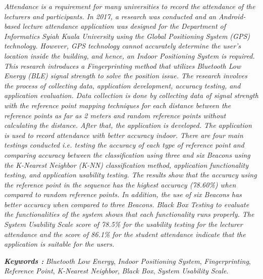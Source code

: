 \begin{abstracteng}
\textit{Attendance is a requirement for many universities to record the attendance of the lecturers and participants. In 2017, a research was conducted and an Android-based lecture attendance application was designed for the Department of Informatics Syiah Kuala University using the Global Positioning System (GPS) technology. However, GPS technology cannot accurately determine the user’s location inside the building, and hence, an Indoor Positioning System is required. This research introduces a Fingerprinting method that utilizes Bluetooth Low Energy (BLE) signal strength to solve the position issue. The research involves the process of collecting data, application development, accuracy testing, and application evaluation. Data collection is done by collecting data of signal strength with the reference point mapping techniques for each distance between the reference points as far as 2 meters and random reference points without calculating the distance. After that, the application is developed. The application is used to record attendance with better accuracy indoor. There are four main testings conducted i.e. testing the accuracy of each type of reference point and comparing accuracy between the classification using three and six Beacons using the K-Nearest Neighbor (K-NN) classification method, application functionality testing, and application usability testing. The results show that the accuracy using the reference point in the sequence has the highest accuracy (78.60\%) when compared to random reference points. In addition, the use of six Beacons has better accuracy when compared to three Beacons. Black Box Testing to evaluate the functionalities of the system shows that each functionality runs properly. The System Usability Scale score of 78.5\% for the usability testing for the lecturer attendance and the score of 86.1\% for the student attendance indicate that the application is suitable for the users.}

\bigskip
\noindent
\textbf{\emph{Keywords :}} \textit{Bluetooth Low Energy}, \textit{Indoor Positioning System}, \textit{Fingerprinting}, \textit{Reference Point}, \textit{K-Nearest Neighbor}, \textit{Black Box}, \textit{System Usability Scale}.
\end{abstracteng}